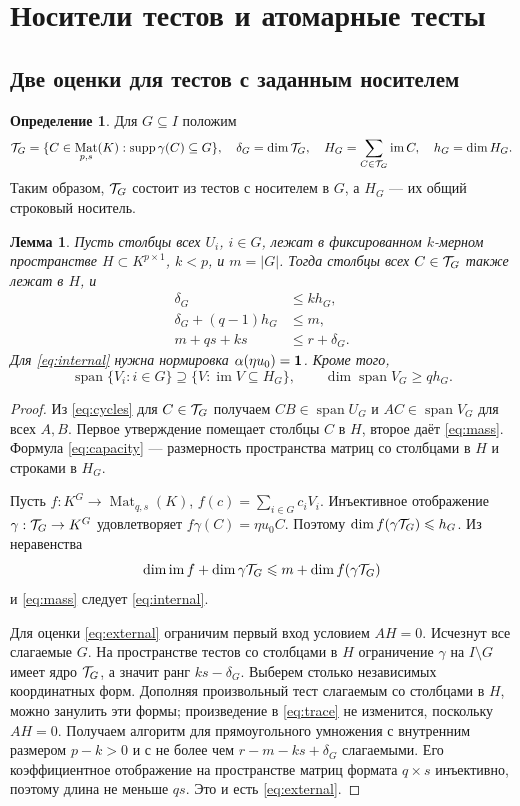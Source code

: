 \documentclass[11pt,a4paper]{article}
\numberwithin{equation}{section}
\theoremstyle{plain}
\newtheorem{lemma}[theorem]{Лемма}
\theoremstyle{definition}
\newtheorem{definition}[theorem]{Определение}
\DeclareMathOperator{\im}{im}\DeclareMathOperator{\supp}{supp}
\DeclareMathOperator{\Mat}{Mat}\DeclareMathOperator{\Span}{span}
\newcommand{\leqs}{\leqslant}\newcommand{\geqs}{\geqslant}
\begin{document}
\section{Носители тестов и атомарные тесты}

\subsection{Две оценки для тестов с заданным носителем}

\begin{definition}
Для $G\subseteq I$ положим
\[
 \test_G=\{C\in\Mat_{p,s}(K):\supp\gamma(C)\subseteq G\},\quad
 \delta_G=\dim\test_G,\quad
 H_G=\sum_{C\in\test_G}\im C,\quad h_G=\dim H_G.
\]
Таким образом, $\mathcal T_G$ состоит из тестов с носителем в $G$,
а $H_G$ --- их общий строковый носитель.
\end{definition}

\begin{lemma}\label{lem:budgets}
Пусть столбцы всех $U_i$, $i\in G$, лежат в фиксированном
$k$-мерном пространстве $H\subset K^{p\times1}$, $k<p$, и $m=|G|$.
Тогда столбцы всех $C\in\mathcal T_G$ также лежат в $H$, и
\begin{align}
 \delta_G&\leqs k h_G,\label{eq:capacity}\\
 \delta_G+(q-1)h_G&\leqs m,\label{eq:internal}\\
 m+qs+ks&\leqs r+\delta_G.\label{eq:external}
\end{align}
Для \eqref{eq:internal} нужна нормировка $\alpha(\eta u_0)=\mathbf1$.
Кроме того,
\begin{equation}\label{eq:mass}
 \Span\{V_i:i\in G\}\supseteq\{V: \im V\subseteq H_G\},
 \qquad \dim\Span V_G\geqs qh_G.
\end{equation}
\end{lemma}
\begin{proof}
Из \eqref{eq:cycles} для $C\in\mathcal T_G$ получаем
$CB\in\Span U_G$ и $AC\in\Span V_G$ для всех $A,B$.
Первое утверждение помещает столбцы $C$ в $H$, второе даёт
\eqref{eq:mass}. Формула \eqref{eq:capacity} --- размерность пространства
матриц со столбцами в $H$ и строками в $H_G$.

Пусть $f:K^G\to\Mat_{q,s}(K)$, $f(c)=\sum_{i\in G}c_iV_i$.
Инъективное отображение $\gamma:\mathcal T_G\to K^G$ удовлетворяет
$f\gamma(C)=\eta u_0C$. Поэтому
$\dim f(\gamma\test_G)\leqs h_G$. Из неравенства
\[
 \dim\im f+\dim\gamma\test_G\leqs m+\dim f(\gamma\test_G)
\]
и \eqref{eq:mass} следует \eqref{eq:internal}.

Для оценки \eqref{eq:external} ограничим первый вход условием $AH=0$.
Исчезнут все слагаемые $G$. На пространстве тестов со столбцами в $H$
ограничение $\gamma$ на $I\setminus G$ имеет ядро $\mathcal T_G$, а значит
ранг $ks-\delta_G$. Выберем столько независимых координатных форм.
Дополняя произвольный тест слагаемым со столбцами в $H$, можно занулить
эти формы; произведение в \eqref{eq:trace} не изменится, поскольку $AH=0$.
Получаем алгоритм для прямоугольного умножения с внутренним размером
$p-k>0$ и с не более чем $r-m-ks+\delta_G$ слагаемыми.
Его коэффициентное отображение на пространстве матриц формата $q\times s$
инъективно, поэтому длина не меньше $qs$. Это и есть \eqref{eq:external}.
\end{proof}
\end{document}
